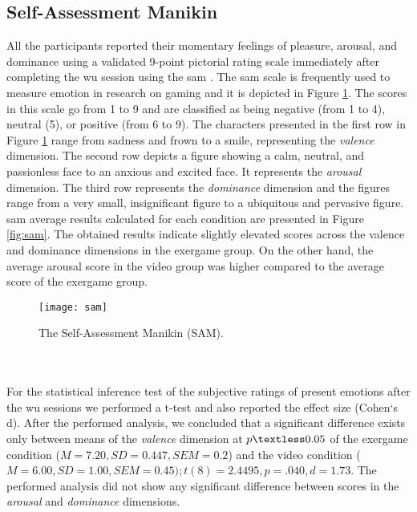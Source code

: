 \subsection{Self-Assessment Manikin}
All the participants reported their momentary feelings of pleasure, arousal, and dominance using a validated 9-point pictorial rating scale immediately after completing the \acrshort{wu} session using the \acrfull{sam} \cite{bradley1994measuring}. The \acrshort{sam} scale is frequently used to measure emotion in research on gaming \cite{poels2012pleasure} and it is depicted in Figure \ref{fig:samoverview}. The scores in this scale go from 1 to 9 and are classified as being negative (from 1 to 4), neutral (5), or positive (from 6 to 9). The characters presented in the first row in Figure \ref{fig:samoverview} range from sadness and frown to a smile, representing the \textit{valence} dimension. The second row depicts a figure showing a calm, neutral, and passionless face to an anxious and excited face. It represents the \textit{arousal} dimension. The third row represents the \textit{dominance} dimension and the figures range from a very small, insignificant figure to a ubiquitous and pervasive figure. \acrshort{sam} average results calculated for each condition are presented in Figure \ref{fig:sam}. The obtained results indicate slightly elevated scores across the valence and dominance dimensions in the exergame group. On the other hand, the average arousal score in the video group was higher compared to the average score of the exergame group. \\
\begin{figure}[h]
    \centering
    \texttt{[image: sam]}
    \caption{The Self-Assessment Manikin (SAM).}
    \label{fig:samoverview}
\end{figure}\\\\
For the statistical inference test of the subjective ratings of present emotions after the \acrshort{wu} sessions we performed a t-test and also reported the effect size (Cohen`s d). After the performed analysis, we concluded that a significant difference exists only between means of the \textit{valence} dimension at  \begin{math}p \textless  0.05 \end{math} of the exergame condition (\begin{math}M = 7.20, SD = 0.447, SEM = 0.2\end{math}) and the video condition (\begin{math}M = 6.00, SD= 1.00, SEM = 0.45); t(8) = 2.4495, p = .040, d =1.73\end{math}.  The performed analysis did not show any significant difference between scores in the \textit{arousal} and \textit{dominance} dimensions.\\
